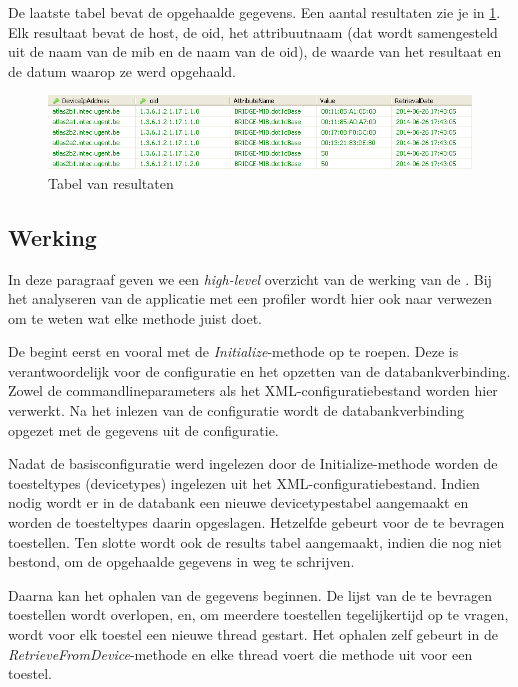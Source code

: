 De laatste tabel bevat de opgehaalde gegevens.
Een aantal resultaten zie je in \cref{fig-db-results}.
Elk resultaat bevat de host, de \gls{oid}, het attribuutnaam (dat wordt samengesteld uit de naam van de \gls{mib} en de naam van de \gls{oid}),
de waarde van het resultaat en de datum waarop ze werd opgehaald.

\begin{figure}[h]
	\centering
	\includegraphics[scale=0.50]{figures/database/results}
	\caption{Tabel van resultaten}
	\label{fig-db-results}
\end{figure}


\subsection{Werking}
\label{werking}

In deze paragraaf geven we een \textit{high-level} overzicht van de werking van de \nwmretriever{}.
Bij het analyseren van de applicatie met een profiler wordt hier ook naar verwezen om te weten wat elke methode juist doet.

De \nwmretriever{} begint eerst en vooral met de \textit{Initialize}-methode op te roepen.
Deze is verantwoordelijk voor de configuratie en het opzetten van de databankverbinding.
Zowel de commandlineparameters als het XML-configuratiebestand worden hier verwerkt.
Na het inlezen van de configuratie wordt de databankverbinding opgezet met de gegevens uit de configuratie.

Nadat de basisconfiguratie werd ingelezen door de Initialize-methode worden de toesteltypes (devicetypes) ingelezen uit het XML-configuratiebestand.
Indien nodig wordt er in de databank een nieuwe devicetypestabel aangemaakt en worden de toesteltypes daarin opgeslagen.
Hetzelfde gebeurt voor de te bevragen toestellen.
Ten slotte wordt ook de results tabel aangemaakt, indien die nog niet bestond, om de opgehaalde gegevens in weg te schrijven.

Daarna kan het ophalen van de gegevens beginnen.
De lijst van de te bevragen toestellen wordt overlopen, en, om meerdere toestellen tegelijkertijd op te vragen,
wordt voor elk toestel een nieuwe thread gestart.
Het ophalen zelf gebeurt in de \textit{RetrieveFromDevice}-methode en elke thread voert die methode uit voor een toestel.

